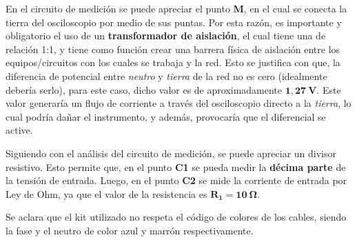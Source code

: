     En el circuito de medición se puede apreciar el punto \textbf{M}, en el cual se conecta la tierra del osciloscopio
    por medio de sus puntas. Por esta razón, es importante y obligatorio el uso de un \textbf{transformador de aislación},
    el cual tiene una de relación 1:1, y tiene como función crear una barrera física de aislación
    entre los equipos/circuitos con los cuales se trabaja y la red. Esto se justifica con que, la diferencia de
    potencial entre \textit{neutro} y \textit{tierra} de la red no es cero (idealmente debería serlo), para este caso, dicho
    valor es de aproximadamente $\mathbf{1,27\ V}$. Este valor generaría un flujo de corriente a través del osciloscopio 
    directo a la \textit{tierra}, lo cual podría dañar el instrumento, y además, provocaría que el diferencial se active.

    Siguiendo con el análisis del circuito de medición, se puede apreciar un divisor resistivo. Esto permite que, en el
    punto \textbf{C1} se pueda medir la \textbf{décima parte} de la tensión de entrada. Luego, en el punto \textbf{C2} 
    se mide la corriente de entrada por Ley de Ohm, ya que el valor de la resistencia es $\mathbf{R_1=10\ \Omega}$.
    
    Se aclara que el kit utilizado no respeta el código de colores de los cables, siendo la fase y el neutro de color azul
    y marrón respectivamente.

    
    


